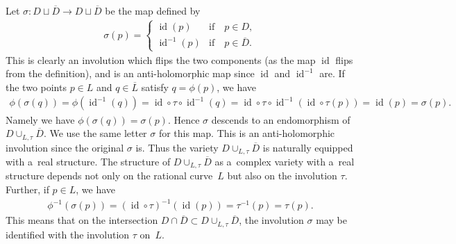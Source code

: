 \documentclass[pdftex]{sigma}
\numberwithin{equation}{section}
\DeclareMathOperator{\id}{id}
\begin{document}
Let $\sigma:D\sqcup \overline D\to D\sqcup \overline D$ be the map def\/ined by
\begin{gather*}
\sigma (p) =
\begin{cases}
\id (p) &\text{if}\quad p\in D,
\\
\id^{-1}(p) &\text{if}\quad p\in \overline D.
\end{cases}
\end{gather*}
This is clearly an involution which f\/lips the two components (as the map $\id$ f\/lips from the def\/inition),
and is an anti-holomorphic map since $\id$ and $\id^{-1}$ are.
If the two points $p\in L$ and $q\in \overline L$ satisfy $q = \phi(p)$, we have
\begin{gather*}
\phi(\sigma(q)) = \phi(\id^{-1}(q))=\id\circ\tau\circ\id^{-1}(q)=\id\circ\tau\circ\id^{-1} (\id\circ\tau(p)) = \id(p)=\sigma(p).
\end{gather*}
Namely we have $\phi(\sigma(q)) = \sigma(p)$.
Hence $\sigma$ descends to an endomorphism of $D\cup_{L,\tau}\overline D$.
We use the same letter $\sigma$ for this map.
This is an anti-holomorphic involution since the original $\sigma$ is.
Thus the variety $D\cup_{L,\tau}\overline D$ is naturally equipped with a~real structure.
The structure of $D\cup_{L,\tau}\overline D$ as a~complex variety with a~real structure depends not only on the
rational curve~$L$ but also on the involution $\tau$.
Further, if $p\in L$, we have
\begin{gather*}
\phi^{-1}(\sigma(p)) = (\id\circ\tau)^{-1}(\id (p)) = \tau^{-1}(p) = \tau (p).
\end{gather*}
This means that on the intersection $D\cap \overline D\subset D\cup_{L,\tau}\overline D$, the involution $\sigma$ may be
identif\/ied with the involution $\tau$ on~$L$.
\end{document}
